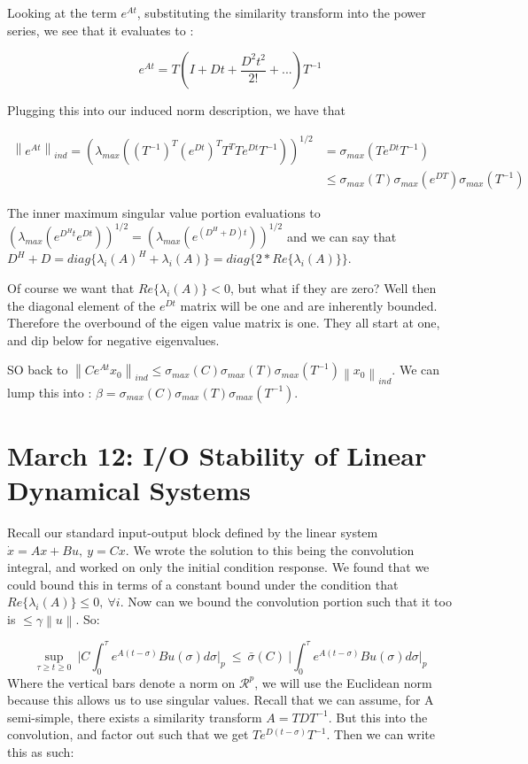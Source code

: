 \documentclass[11pt]{article}
\newcommand{\norm}[1]{\left\lVert#1\right\rVert}
\begin{document}
Looking at the term $e^{At}$, substituting the similarity transform into the power series, we see that it evaluates to : 

\begin{equation}
e^{At} = T(I + Dt + \frac{D^2t^2}{2!}+ ...)T^{-1}
\end{equation}

Plugging this into our induced norm description, we have that 

\begin{align}
\norm{e^{At}}_{ind} =(\lambda_{max}((T^{-1})^T(e^{Dt})^TT^TTe^{Dt}T^{-1}))^{1/2} & = \sigma_{max}(Te^{Dt}T^{-1}) \\
& \leq \sigma_{max}(T)\sigma_{max}(e^{DT})\sigma_{max}(T^{-1})
\end{align}

The inner maximum singular value portion evaluations to $(\lambda_{max} (e^{D^Ht}e^{Dt}))^{1/2} = (\lambda_{max} (e^{(D^H + D)t}))^{1/2} $ and we can say that $D^H + D = diag\{ \lambda_i(A)^H + \lambda_i(A) \} = diag\{2*Re\{ \lambda_i(A) \}\}$.

Of course we want that $Re\{ \lambda_i(A) \} < 0$, but what if they are zero? Well then the diagonal element of the $e^{Dt}$ matrix will be one and are inherently bounded. Therefore the overbound of the eigen value matrix is one. They all start at one, and dip below for negative eigenvalues. 


SO back to $\norm{Ce^{At}x_0}_{ind} \leq \sigma_{max}(C)\sigma_{max}(T)\sigma_{max}(T^{-1})\norm{x_0}_{ind}$. We can lump this into : $\beta = \sigma_{max}(C)\sigma_{max}(T)\sigma_{max}(T^{-1}) $.


\section{March 12: I/O Stability of Linear Dynamical Systems}
Recall our standard input-output block defined by the linear system $\dot{x} = Ax+Bu, \ y=Cx$. We wrote the solution to this being the convolution integral, and worked on only the initial condition response. We found that we could bound this in terms of a constant bound under the condition that $Re\{ \lambda_i(A) \} \leq 0, \ \forall i$. Now can we bound the convolution portion such that it too is $\leq \gamma \norm{u}$. So:


\begin{equation}
	\sup_{\tau \geq t \geq0} \  \bigg \rvert C \int_0^\tau e^{A(t-\sigma)}Bu(\sigma)d\sigma  \bigg \rvert_p \ \leq \ \bar{\sigma}(C) \ \bigg  \rvert \int_0^\tau e^{A(t-\sigma)}Bu(\sigma)d\sigma \bigg  \rvert_p
\end{equation}
Where the vertical bars denote a norm on $\mathcal{R}^p$, we will use the Euclidean norm because this allows us to use singular values. Recall that we can assume, for A semi-simple, there exists a similarity transform $A = TDT^{-1}$. But this into the convolution, and factor out such that we get $Te^{D(t-\sigma)}T^{-1}$. Then we can write this as such: 
\end{document}
